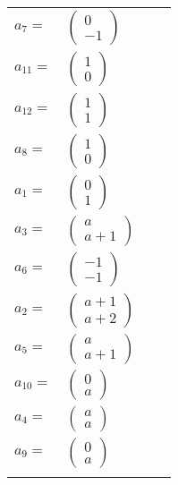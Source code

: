 \documentclass[1p]{elsarticle_modified}
\theoremstyle{definition}
\begin{document}
\begin{tabular}{m{7pt} m{180pt} m{7pt} m{180pt} }
\flushright $a_{7}=$&$\begin{pmatrix}0\\-1\end{pmatrix}$ \\
\flushright $a_{11}=$&$\begin{pmatrix}1\\0\end{pmatrix}$ \\
\flushright $a_{12}=$&$\begin{pmatrix}1\\1\end{pmatrix}$ \\
\flushright $a_{8}=$&$\begin{pmatrix}1\\0\end{pmatrix}$ \\
\flushright $a_{1}=$&$\begin{pmatrix}0\\1\end{pmatrix}$ \\
\flushright $a_{3}=$&$\begin{pmatrix}a\\a+1\end{pmatrix}$ \\
\flushright $a_{6}=$&$\begin{pmatrix}-1\\-1\end{pmatrix}$ \\
\flushright $a_{2}=$&$\begin{pmatrix}a+1\\a+2\end{pmatrix}$ \\
\flushright $a_{5}=$&$\begin{pmatrix}a\\a+1\end{pmatrix}$ \\
\flushright $a_{10}=$&$\begin{pmatrix}0\\a\end{pmatrix}$ \\
\flushright $a_{4}=$&$\begin{pmatrix}a\\a\end{pmatrix}$ \\
\flushright $a_{9}=$&$\begin{pmatrix}0\\a\end{pmatrix}$\\&\end{tabular}
\end{document}
